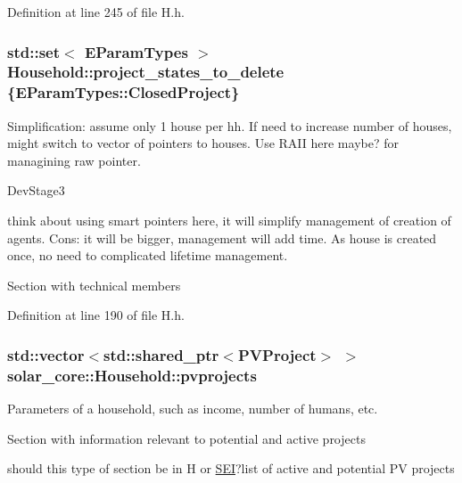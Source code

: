 Definition at line 245 of file H.\+h.

\hypertarget{classsolar__core_1_1_household_ad7ec15745665433a5f9f174e8618bdc7}{}
\subsubsection[{project\+\_\+states\+\_\+to\+\_\+delete}]{\setlength{\rightskip}{0pt plus 5cm}std\+::set$<$ {\bf E\+Param\+Types} $>$ Household\+::project\+\_\+states\+\_\+to\+\_\+delete \{{\bf E\+Param\+Types\+::\+Closed\+Project}\}\hspace{0.3cm}{\ttfamily [static]}}\label{classsolar__core_1_1_household_ad7ec15745665433a5f9f174e8618bdc7}
Simplification\+: assume only 1 house per hh. If need to increase number of houses, might switch to vector of pointers to houses. Use R\+A\+I\+I here maybe? for managining raw pointer.\begin{DoxyRefDesc}{Dev\+Stage3}
\item[\hyperlink{_dev_stage3__DevStage3000003}{Dev\+Stage3}]think about using smart pointers here, it will simplify management of creation of agents. Cons\+: it will be bigger, management will add time. As house is created once, no need to complicated lifetime management. \end{DoxyRefDesc}


Section with technical members 

Definition at line 190 of file H.\+h.

\hypertarget{classsolar__core_1_1_household_a79c0e955af98669487e0fb472811f842}{}
\subsubsection[{pvprojects}]{\setlength{\rightskip}{0pt plus 5cm}std\+::vector$<$std\+::shared\+\_\+ptr$<${\bf P\+V\+Project}$>$ $>$ solar\+\_\+core\+::\+Household\+::pvprojects\hspace{0.3cm}{\ttfamily [protected]}}\label{classsolar__core_1_1_household_a79c0e955af98669487e0fb472811f842}
Parameters of a household, such as income, number of humans, etc. \begin{DoxyVerb} Section with information relevant to potential and active projects
\end{DoxyVerb}
 should this type of section be in H or \hyperlink{classsolar__core_1_1_s_e_i}{S\+E\+I}?list of active and potential P\+V projects 

